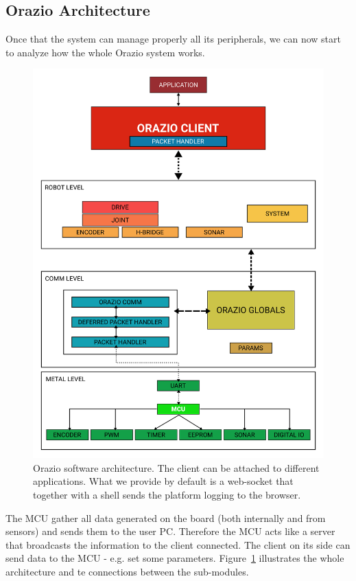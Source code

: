 \documentclass[10pt,a4paper, notitlepage]{report}
\begin{document}
\subsection*{Orazio Architecture}
Once that the system can manage properly all its peripherals, we can now start to analyze how the whole Orazio system works.

\begin{figure}[!h]
  \centering
  \includegraphics[width=0.8\linewidth]{pics/orazio_arch}
  \caption{Orazio software architecture. The client can be attached to different applications. What we provide by default is a web-socket that together with a shell sends the platform logging to the browser.}
  \label{fig:orazio_arch}
\end{figure}

The MCU gather all data generated on the board (both internally and from sensors) and sends them to the user PC. Therefore the MCU acts like a server that broadcasts the information to the client connected. The client on its side can send data to the MCU - e.g. set some parameters. Figure~\ref{fig:orazio_arch} illustrates the whole architecture and te connections between the sub-modules.
\end{document}
